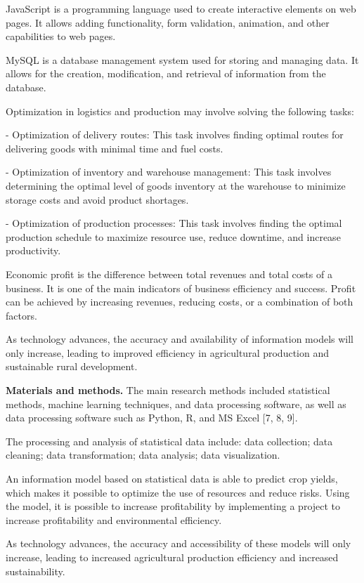 JavaScript is a programming language used to create interactive elements
on web pages. It allows adding functionality, form validation,
animation, and other capabilities to web pages.

MySQL is a database management system used for storing and managing
data. It allows for the creation, modification, and retrieval of
information from the database.

Optimization in logistics and production may involve solving the
following tasks:

- Optimization of delivery routes: This task involves finding optimal
routes for delivering goods with minimal time and fuel costs.

- Optimization of inventory and warehouse management: This task involves
determining the optimal level of goods inventory at the warehouse to
minimize storage costs and avoid product shortages.

- Optimization of production processes: This task involves finding the
optimal production schedule to maximize resource use, reduce downtime,
and increase productivity.

Economic profit is the difference between total revenues and total costs
of a business. It is one of the main indicators of business efficiency
and success. Profit can be achieved by increasing revenues, reducing
costs, or a combination of both factors.

As technology advances, the accuracy and availability of information
models will only increase, leading to improved efficiency in
agricultural production and sustainable rural development.

\textbf{Materials and methods.} The main research methods included
statistical methods, machine learning techniques, and data processing
software, as well as data processing software such as Python, R, and MS
Excel {[}7, 8, 9{]}.

The processing and analysis of statistical data include: data
collection; data cleaning; data transformation; data analysis; data
visualization.

An information model based on statistical data is able to predict crop
yields, which makes it possible to optimize the use of resources and
reduce risks. Using the model, it is possible to increase profitability
by implementing a project to increase profitability and environmental
efficiency.

As technology advances, the accuracy and accessibility of these models
will only increase, leading to increased agricultural production
efficiency and increased sustainability.

